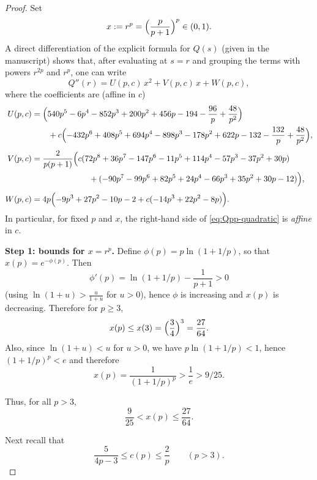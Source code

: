 \documentclass[11pt]{article}
\theoremstyle{definition}
\newcommand{\1}{\mathbf{1}}
\begin{document}
\begin{proof}
Set
\[
x:=r^{p}=\Bigl(\frac{p}{p+1}\Bigr)^{p}\in(0,1).
\]
A direct differentiation of the explicit formula for $Q(s)$ (given in the manuscript) shows that,
after evaluating at $s=r$ and grouping the terms with powers $r^{2p}$ and $r^{p}$,
one can write
\begin{equation}\label{eq:Qpp-quadratic}
Q''(r)=U(p,c)\,x^{2}+V(p,c)\,x+W(p,c),
\end{equation}
where the coefficients are (affine in $c$)
\begin{align}
U(p,c)
&=
\Bigl(540p^{5}-6p^{4}-852p^{3}+200p^{2}+456p-194-\frac{96}{p}+\frac{48}{p^{2}}\Bigr)
\label{eq:U-def}\\
&\qquad
+c\Bigl(-432p^{6}+408p^{5}+694p^{4}-898p^{3}-178p^{2}+622p-132-\frac{132}{p}+\frac{48}{p^{2}}\Bigr),\nonumber\\[0.3em]
V(p,c)
&=
\frac{2}{p(p+1)}\Bigl(
c(72p^{8}+36p^{7}-147p^{6}-11p^{5}+114p^{4}-57p^{3}-37p^{2}+30p)\label{eq:V-def}\\
&\hspace{7em}
+(-90p^{7}-99p^{6}+82p^{5}+24p^{4}-66p^{3}+35p^{2}+30p-12)
\Bigr),\nonumber\\[0.3em]
W(p,c)
&=
4p\Bigl(-9p^{3}+27p^{2}-10p-2+c(-14p^{3}+22p^{2}-8p)\Bigr).
\label{eq:W-def}
\end{align}
In particular, for fixed $p$ and $x$, the right-hand side of \eqref{eq:Qpp-quadratic} is \emph{affine}
in $c$.

\medskip
\noindent\textbf{Step 1: bounds for $x=r^{p}$.}
Define $\phi(p)=p\ln(1+1/p)$, so that $x(p)=e^{-\phi(p)}$.
Then
\[
\phi'(p)=\ln(1+1/p)-\frac{1}{p+1}>0
\]
(using $\ln(1+u)>\frac{u}{1+u}$ for $u>0$), hence $\phi$ is increasing and $x(p)$ is decreasing.
Therefore for $p\ge 3$,
\begin{equation}\label{eq:x-upper}
x(p)\le x(3)=\Bigl(\frac{3}{4}\Bigr)^{3}=\frac{27}{64}.
\end{equation}
Also, since $\ln(1+u)<u$ for $u>0$, we have $p\ln(1+1/p)<1$, hence $(1+1/p)^{p}<e$
and therefore
\begin{equation}\label{eq:x-lower-e}
x(p)=\frac{1}{(1+1/p)^{p}}>\frac{1}{e}>9/25.
\end{equation}

Thus, for all $p>3$,
\begin{equation}\label{eq:x-bounds-r}
\frac{9}{25}<x(p)\le \frac{27}{64}.
\end{equation}

Next recall that
\begin{equation}\label{eq:c-bounds-basic}
\frac{5}{4p-3}\le c(p)\le \frac{2}{p}\qquad(p>3).
\end{equation}


\end{proof}
\end{document}

